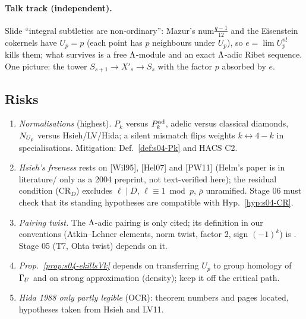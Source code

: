 \paragraph{Talk track (independent).}
Slide ``integral subtleties are non-ordinary'': Mazur's $\mathrm{num}\frac{q-1}{12}$ and the Eisenstein cokernels have $U_p=p$ (each
point has $p$ neighbours under $U_p$), so $e=\lim U_p^{n!}$ kills them; what survives is a free $\Lambda$-module and an exact
$\Lambda$-adic Ribet sequence. One picture: the tower $S_{s+1}\to X'_s\to S_s$ with the factor $p$ absorbed by $e$.

\subsection{Risks}
\begin{enumerate}[label=R\arabic*.]
\item \emph{Normalisations} (highest). $P_k$ versus $P^{\rm ad}_k$, adelic versus classical diamonds, $N_{U_p}$ versus Hsieh/LV/Hida;
  a silent mismatch flips weights $k\leftrightarrow 4-k$ in specialisations. Mitigation: Def.~\ref{def:s04-Pk} and HACS C2.
\item \emph{Hsieh's freeness} rests on [Wil95], [Hel07] and [PW11] (Helm's paper is in literature/ only as a 2004 preprint, not
  text-verified here); the residual condition (CR$_D$) excludes $\ell\mid D$, $\ell\equiv1\bmod p$, $\bar\rho$ unramified.
  Stage 06 must check that its standing hypotheses are compatible with
  Hyp.~\ref{hyp:s04-CR}.
\item \emph{Pairing twist.} The $\Lambda$-adic pairing is only cited; its definition in our conventions (Atkin--Lehner elements, norm twist,
  factor $2$, sign $(-1)^k$) is \sttoprove. Stage 05 (T7, Ohta twist) depends on it.
\item \emph{Prop.~\ref{prop:s04-ekillsVk}} depends on transferring $U_p$ to group homology of $\Gamma_U$ and on strong approximation
  (density); keep it off the critical path.
\item \emph{Hida 1988 only partly legible} (OCR): theorem numbers and pages located, hypotheses taken from Hsieh and LV11.
\end{enumerate}
